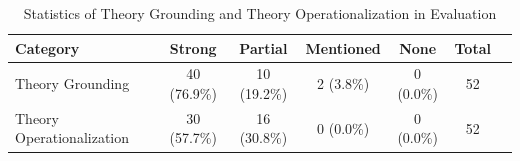 \begin{table}[htbp]
\centering
\caption{Statistics of Theory Grounding and Theory Operationalization in Evaluation}
\label{tab:theory-stats}
\begin{tabular}{lcccccc}
\toprule
\textbf{Category} & \textbf{Strong} & \textbf{Partial} & \textbf{Mentioned} & \textbf{None} & \textbf{Total} \\
\midrule
Theory Grounding & 40 (76.9\%) & 10 (19.2\%) & 2 (3.8\%) & 0 (0.0\%) & 52 \\
Theory Operationalization & 30 (57.7\%) & 16 (30.8\%) & 0 (0.0\%) & 0 (0.0\%) & 52 \\
\bottomrule
\end{tabular}
\end{table}
